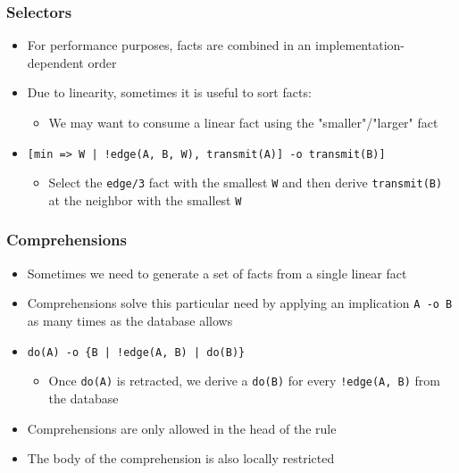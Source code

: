 \documentclass{beamer}
\begin{document}
\begin{frame}[fragile]
   \frametitle{Selectors}
   \begin{itemize}
      \item For performance purposes, facts are combined in an implementation-dependent order
      \item Due to linearity, sometimes it is useful to sort facts:
      \begin{itemize}
         \item We may want to consume a linear fact using the "smaller"/"larger" fact
      \end{itemize}
      \item {\small \texttt{[min => W | !edge(A, B, W), transmit(A)] -o transmit(B)]}}
      \begin{itemize}
         \item Select the \texttt{edge/3} fact with the smallest \texttt{W} and then derive \texttt{transmit(B)} at the neighbor with the smallest \texttt{W}
      \end{itemize}
   \end{itemize}
\end{frame}

\begin{frame}[fragile]
   \frametitle{Comprehensions}
   \begin{itemize}
      \item Sometimes we need to generate a set of facts from a single linear fact
      \item Comprehensions solve this particular need by applying an implication \texttt{A -o B} as many times as the database allows
      \item {\small \texttt{do(A) -o \{B | !edge(A, B) | do(B)\}}}
      \begin{itemize}
         \item Once \texttt{do(A)} is retracted, we derive a \texttt{do(B)} for every \texttt{!edge(A, B)} from the database
      \end{itemize}
      \item Comprehensions are only allowed in the head of the rule
      \item The body of the comprehension is also locally restricted
   \end{itemize}
\end{frame}
\end{document}
